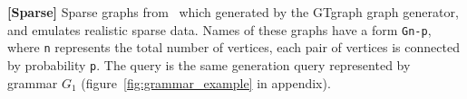 \textbf{[Sparse]} Sparse graphs from~\cite{fan2018scaling} which generated by the GTgraph graph generator, and emulates realistic sparse data.
Names of these graphs have a form \texttt{Gn-p}, where \texttt{n} represents the total number of vertices, each pair of vertices is connected by probability \texttt{p}.
The query is the same generation query represented by grammar $G_1$ (figure~\ref{fig:grammar_example} in appendix).

